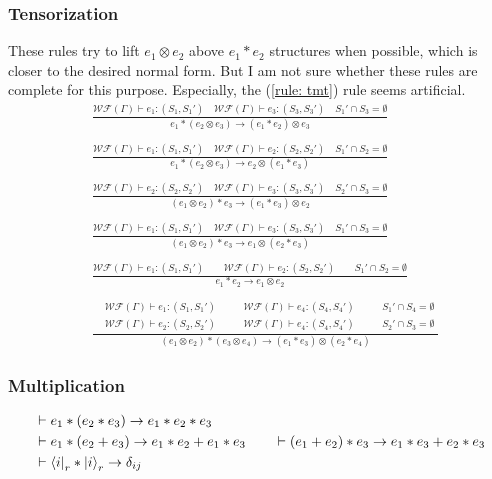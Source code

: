 \documentclass{article}
\begin{document}
\subsubsection*{Tensorization}
These rules try to lift $e_1 \otimes e_2$ above $e_1 * e_2$ structures when possible, which is closer to the desired normal form. But I am not sure whether these rules are complete for this purpose. Especially, the (\ref{rule: tmt}) rule seems artificial.
\begin{align*}
  & \frac{\mathcal{WF}(\Gamma)\vdash e_1 : (S_1, S_1')\quad \mathcal{WF}(\Gamma)\vdash e_3 : (S_3, S_3')\quad S_1' \cap S_3 = \emptyset}
  {e_1 * (e_2 \otimes e_3) \to (e_1 * e_2) \otimes e_3} \\
  &\ \\
  & \frac{\mathcal{WF}(\Gamma)\vdash e_1 : (S_1, S_1')\quad \mathcal{WF}(\Gamma)\vdash e_2 : (S_2, S_2')\quad S_1' \cap S_2 = \emptyset}
  {e_1 * (e_2 \otimes e_3) \to e_2 \otimes (e_1 * e_3)} \\
  &\ \\
  & \frac{\mathcal{WF}(\Gamma)\vdash e_2 : (S_2, S_2')\quad \mathcal{WF}(\Gamma)\vdash e_3 : (S_3, S_3')\quad S_2' \cap S_3 = \emptyset}
  {(e_1 \otimes e_2) * e_3 \to (e_1 * e_3) \otimes e_2} \\
  &\ \\
  & \frac{\mathcal{WF}(\Gamma)\vdash e_1 : (S_1, S_1')\quad \mathcal{WF}(\Gamma)\vdash e_3 : (S_3, S_3')\quad S_1' \cap S_3 = \emptyset}
  {(e_1 \otimes e_2) * e_3 \to e_1 \otimes(e_2* e_3)} \\
  &\ \\
  & \frac{\mathcal{WF}(\Gamma)\vdash e_1 : (S_1, S_1')\qquad \mathcal{WF}(\Gamma)\vdash e_2 : (S_2, S_2')\qquad S_1' \cap S_2 = \emptyset}
  {e_1 * e_2 \to e_1 \otimes e_2}\\
  &\ \\
  & \frac{
    \begin{aligned}
      & \mathcal{WF}(\Gamma) \vdash e_1 : (S_1, S_1')\qquad & \mathcal{WF}(\Gamma) \vdash e_4 : (S_4, S_4') \qquad & S_1' \cap S_4 = \emptyset\\
      & \mathcal{WF}(\Gamma) \vdash e_2 : (S_2, S_2') & \mathcal{WF}(\Gamma) \vdash e_4 : (S_4, S_4')\qquad & S_2' \cap S_3 = \emptyset
    \end{aligned}
  }{(e_1 \otimes e_2) * (e_3 \otimes e_4) \to (e_1 * e_3) \otimes (e_2 * e_4)} \tag{*} \label{rule: tmt}
\end{align*}

\subsubsection*{Multiplication}
\begin{align*}
  & \vdash e_1 * (e_2 * e_3) \to e_1 * e_2 * e_3\\
  & \vdash e_1 * (e_2 + e_3) \to e_1 * e_2 + e_1 * e_3
  \qquad \vdash (e_1 + e_2) * e_3 \to e_1 * e_3 + e_2 * e_3\\
  & \vdash \bra{i}_r * \ket{i}_r \to \delta_{ij}
\end{align*}
\end{document}
